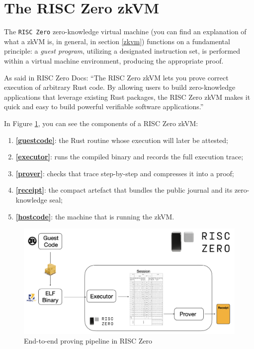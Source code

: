 \section{The RISC Zero zkVM} \makeatletter{}\makeatother
\label{risc0_zkVM}
The \texttt{RISC Zero} zero-knowledge virtual machine (you can find an explanation of what a zkVM is, in general, in section \ref{zkvm}) functions on a fundamental principle: a \textit{guest program}, utilizing a designated instruction set, is performed within a virtual machine environment, producing the appropriate proof.

As said in RISC Zero Docs: “The RISC Zero zkVM lets you prove correct execution of arbitrary Rust code. By allowing users to build zero-knowledge applications that leverage existing Rust packages, the RISC Zero zkVM makes it quick and easy to build powerful verifiable software applications.”\cite{risc0_zkvm}

In Figure \ref{fig:pipeline_RISC Zero}, you can see the components of a RISC Zero zkVM:

\begin{enumerate}
  \item \textbf{\ref{guestcode}}: the Rust routine whose execution will later be attested;
  \item \textbf{\ref{executor}}: runs the compiled binary and records the full execution trace;
  \item \textbf{\ref{prover}}: checks that trace step-by-step and compresses it into a proof;
  \item \textbf{\ref{receipt}}: the compact artefact that bundles the public journal and its zero-knowledge seal;
  \item \textbf{\ref{hostcode}}: the machine that is running the zkVM.
  
\end{enumerate}

\begin{figure}[h]
    \centering
    \includegraphics[width=1\linewidth]{Images/Chap2/risc0_flow.png}
    \caption{End-to-end proving pipeline in RISC Zero \cite{risc0_zkvm}}
    \label{fig:pipeline_RISC Zero}
\end{figure}

